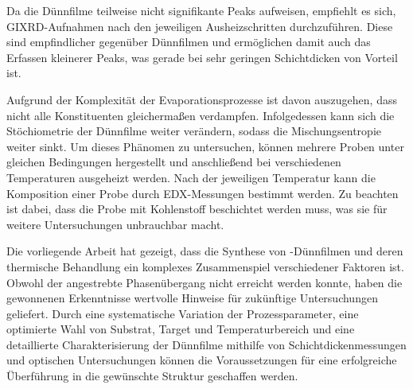 Da die Dünnfilme teilweise nicht signifikante Peaks aufweisen, empfiehlt es sich, GIXRD-Aufnahmen
nach den jeweiligen Ausheizschritten durchzuführen.
Diese sind empfindlicher gegenüber Dünnfilmen und ermöglichen damit auch das Erfassen kleinerer Peaks, was gerade
bei sehr geringen Schichtdicken von Vorteil ist.

Aufgrund der Komplexität der Evaporationsprozesse ist davon auszugehen, dass nicht alle Konstituenten gleichermaßen
verdampfen.
Infolgedessen kann sich die Stöchiometrie der Dünnfilme weiter verändern, sodass die Mischungsentropie
weiter sinkt.
Um dieses Phänomen zu untersuchen, können mehrere Proben unter gleichen Bedingungen hergestellt und anschließend
bei verschiedenen Temperaturen ausgeheizt werden.
Nach der jeweiligen Temperatur kann die Komposition einer Probe durch EDX-Messungen bestimmt werden.
Zu beachten ist dabei, dass die Probe mit Kohlenstoff beschichtet werden muss, was sie für weitere
Untersuchungen unbrauchbar macht.

Die vorliegende Arbeit hat gezeigt, dass die Synthese von \heo-Dünnfilmen und deren thermische Behandlung ein komplexes
Zusammenspiel verschiedener Faktoren ist.
Obwohl der angestrebte Phasenübergang nicht erreicht werden konnte, haben die gewonnenen Erkenntnisse wertvolle Hinweise
für zukünftige Untersuchungen geliefert.
Durch eine systematische Variation der Prozessparameter, eine optimierte Wahl von Substrat, Target und Temperaturbereich
und eine detaillierte Charakterisierung der Dünnfilme mithilfe von Schichtdickenmessungen und optischen Untersuchungen
können die Voraussetzungen für eine erfolgreiche Überführung in die gewünschte Struktur geschaffen werden.
